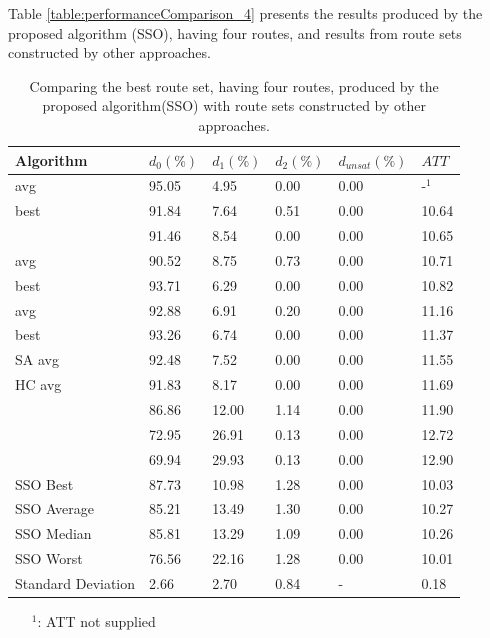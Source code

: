 Table \vref{table:performanceComparison_4} presents the results produced by the proposed algorithm (SSO), having four routes, and results from route sets constructed by other approaches.

\begin{table}[H]
	\centering
    \hspace*{-1.0cm}
    \begin{tabular}{|l||l|l|l|l|l|}
 	\hline
 	Algorithm & $d_0(\%)$ & $d_1(\%)$ & $d_2(\%)$ & $d_{unsat}(\%)$ & $ATT$ \\
 	\hline
    \citet{nikolic14} avg & 95.05 & 4.95 & 0.00 & 0.00 & -$^1$ \\
    \citet{kechagiopoulos14} best & 91.84 & 7.64 & 0.51 & 0.00 & 10.64 \\
    \citet{zhang10} & 91.46 & 8.54 & 0.00 & 0.00 & 10.65 \\
    \citet{kechagiopoulos14} avg & 90.52 & 8.75 & 0.73 & 0.00 & 10.71 \\
    \citet{chew12} best & 93.71 & 6.29 & 0.00 & 0.00 & 10.82 \\
    \citet{chew12} avg & 92.88 & 6.91 & 0.20 & 0.00 & 11.16 \\
    \citet{fan10} best & 93.26 & 6.74 & 0.00 & 0.00 & 11.37 \\
    \citet{fan10} SA avg & 92.48 & 7.52 & 0.00 & 0.00 & 11.55 \\
    \citet{fan10} HC avg & 91.83 & 8.17 & 0.00 & 0.00 & 11.69 \\
    \citet{chakroborty02} & 86.86 & 12.00 & 1.14 & 0.00 & 11.90 \\
    \citet{kidwai98} & 72.95 & 26.91 & 0.13 & 0.00 & 12.72 \\
    \citet{mandl79} & 69.94 & 29.93 & 0.13 & 0.00 & 12.90 \\
    \hline
    SSO Best & 87.73 & 10.98 & 1.28 & 0.00 & 10.03\\
    SSO Average & 85.21 & 13.49 & 1.30 & 0.00 & 10.27\\
    SSO Median & 85.81 & 13.29 & 1.09 & 0.00 & 10.26\\
    SSO Worst & 76.56 & 22.16 & 1.28 & 0.00 & 10.01\\
    Standard Deviation & 2.66 & 2.70 & 0.84 & - & 0.18\\
    \hline
    \end{tabular}
    \caption {Comparing the best route set, having four routes, produced by the proposed algorithm(SSO) with route sets constructed by other approaches.}
    \begin{itemize}[noitemsep]
    \item[$^1$:] ATT not supplied
    \end{itemize}
    \label{table:performanceComparison_4}
\end{table}

